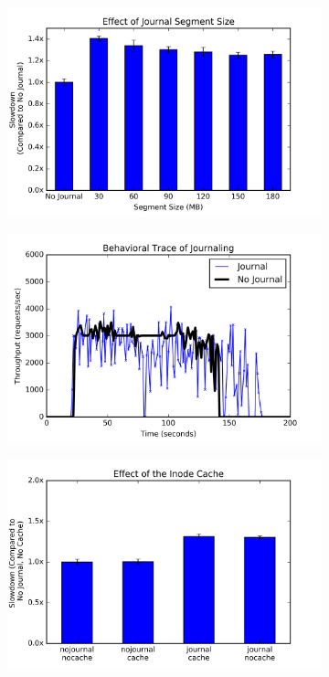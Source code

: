 \begin{figure}[t]
  \centering
  \begin{subfigure}[b]{.3\linewidth}
      \centering
      \includegraphics[width=1.0\linewidth]{graphs/slowdown-journal.png}
      \caption{}
      \label{fig:phy-design}
  \end{subfigure}
  \begin{subfigure}[b]{.3\linewidth}
      \centering
      \includegraphics[width=1.0\linewidth]{graphs/behavior-journal.png}
      \caption{}
      \label{fig:batching}
  \end{subfigure}
  \begin{subfigure}[b]{.3\linewidth}
      \centering
      \includegraphics[width=1.0\linewidth]{graphs/slowdown-cache.png}

\end{subfigure}
\end{figure}
